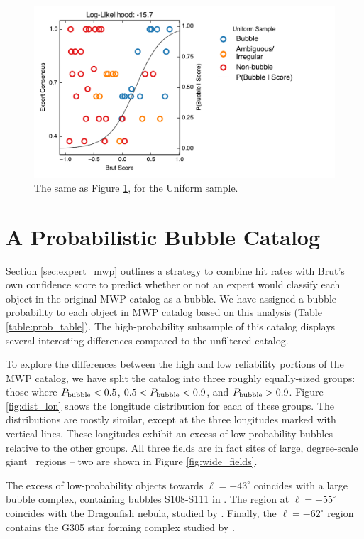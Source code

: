 \begin{figure}
\includegraphics{expert_uniform_score}
\caption{The same as Figure \ref{fig:expert_uniform_score}, for the Uniform sample.}
\label{fig:expert_uniform_score}
\end{figure}

\section{A Probabilistic Bubble Catalog}
\label{sec:prob}
Section \ref{sec:expert_mwp} outlines a strategy to combine hit rates with Brut's own confidence score to predict whether or not
an expert would classify each object in the original MWP catalog as a bubble. We have assigned a bubble probability to each
object in MWP catalog based on this analysis (Table \ref{table:prob_table}). The high-probability subsample of this catalog displays several interesting differences compared to the unfiltered catalog.

To explore the differences between the high and low reliability portions of the MWP catalog, we have split the catalog into three roughly equally-sized groups: those where $P_{\rm bubble} < 0.5$, $0.5 < P_{\rm bubble} < 0.9$,
and $P_{\rm bubble} > 0.9$. Figure \ref{fig:dist_lon} shows the longitude distribution for each of these groups. The distributions are mostly similar, except at the three longitudes marked with vertical lines. These longitudes exhibit an excess of low-probability bubbles relative to the other groups.  All three fields are in fact sites of large, degree-scale giant \hii\, regions -- two are shown in Figure \ref{fig:wide_fields}.

The excess of low-probability objects towards $\ell=-43^\circ$ coincides with a large bubble complex, containing bubbles S108-S111 in \cite{Churchwell06}. The region at $\ell=-55^\circ$ coincides with the Dragonfish nebula, studied by \cite{Rahman11}. Finally, the $\ell=-62^\circ$ region contains the G305 star forming complex studied by \cite{Hindson12}.


